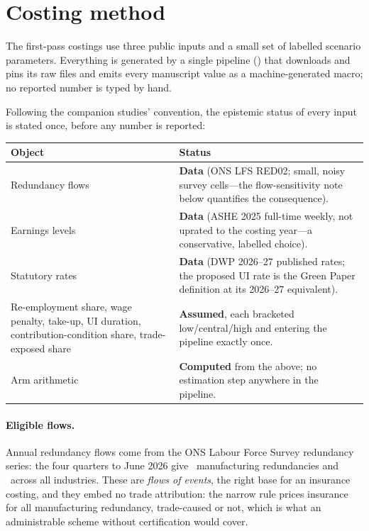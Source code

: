 \section{Costing method}\label{sec:method}

The first-pass costings use three public inputs and a small set of
labelled scenario parameters. Everything is generated by a single
pipeline () that downloads and pins its raw
files and emits every manuscript value as a machine-generated macro; no
reported number is typed by hand.

Following the companion studies' convention, the epistemic status of
every input is stated once, before any number is reported:

\begin{center}
\small
\begin{tabular}{p{}p{}}
\toprule
Object & Status \\
\midrule
Redundancy flows & \textbf{Data} (ONS LFS RED02; small, noisy survey cells---the flow-sensitivity note below quantifies the consequence). \\
Earnings levels & \textbf{Data} (ASHE 2025 full-time weekly, not uprated to the costing year---a conservative, labelled choice). \\
Statutory rates & \textbf{Data} (DWP 2026--27 published rates; the proposed UI rate is the Green Paper definition at its 2026--27 equivalent). \\
Re-employment share, wage penalty, take-up, UI duration, contribution-condition share, trade-exposed share & \textbf{Assumed}, each bracketed low/central/high and entering the pipeline exactly once. \\
Arm arithmetic & \textbf{Computed} from the above; no estimation step anywhere in the pipeline. \\
\bottomrule
\end{tabular}
\end{center}

\paragraph{Eligible flows.} Annual redundancy flows come from the ONS
Labour Force Survey redundancy series: the four quarters to June 2026 give
\TaaFlowManuf\ manufacturing redundancies and \TaaFlowAll\ across all
industries. These are \emph{flows of events}, the right base for an
insurance costing, and they embed no trade attribution: the narrow rule
prices insurance for all manufacturing redundancy, trade-caused or not,
which is what an administrable scheme without certification would cover.

